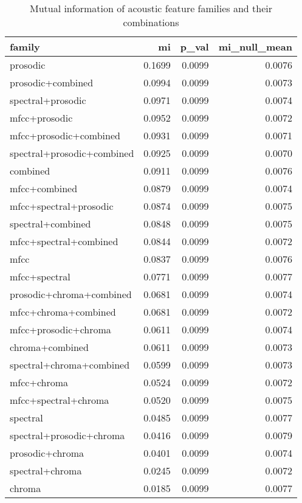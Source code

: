 \begin{table}
\caption{Mutual information of acoustic feature families and their combinations}
\label{tab:mi_scores}
\begin{tabular}{lrrr}
\toprule
family & mi & p_val & mi_null_mean \\
\midrule
prosodic & 0.1699 & 0.0099 & 0.0076 \\
prosodic+combined & 0.0994 & 0.0099 & 0.0073 \\
spectral+prosodic & 0.0971 & 0.0099 & 0.0074 \\
mfcc+prosodic & 0.0952 & 0.0099 & 0.0072 \\
mfcc+prosodic+combined & 0.0931 & 0.0099 & 0.0071 \\
spectral+prosodic+combined & 0.0925 & 0.0099 & 0.0070 \\
combined & 0.0911 & 0.0099 & 0.0076 \\
mfcc+combined & 0.0879 & 0.0099 & 0.0074 \\
mfcc+spectral+prosodic & 0.0874 & 0.0099 & 0.0075 \\
spectral+combined & 0.0848 & 0.0099 & 0.0075 \\
mfcc+spectral+combined & 0.0844 & 0.0099 & 0.0072 \\
mfcc & 0.0837 & 0.0099 & 0.0076 \\
mfcc+spectral & 0.0771 & 0.0099 & 0.0077 \\
prosodic+chroma+combined & 0.0681 & 0.0099 & 0.0074 \\
mfcc+chroma+combined & 0.0681 & 0.0099 & 0.0072 \\
mfcc+prosodic+chroma & 0.0611 & 0.0099 & 0.0074 \\
chroma+combined & 0.0611 & 0.0099 & 0.0073 \\
spectral+chroma+combined & 0.0599 & 0.0099 & 0.0073 \\
mfcc+chroma & 0.0524 & 0.0099 & 0.0072 \\
mfcc+spectral+chroma & 0.0520 & 0.0099 & 0.0075 \\
spectral & 0.0485 & 0.0099 & 0.0077 \\
spectral+prosodic+chroma & 0.0416 & 0.0099 & 0.0079 \\
prosodic+chroma & 0.0401 & 0.0099 & 0.0074 \\
spectral+chroma & 0.0245 & 0.0099 & 0.0072 \\
chroma & 0.0185 & 0.0099 & 0.0077 \\
\bottomrule
\end{tabular}
\end{table}
